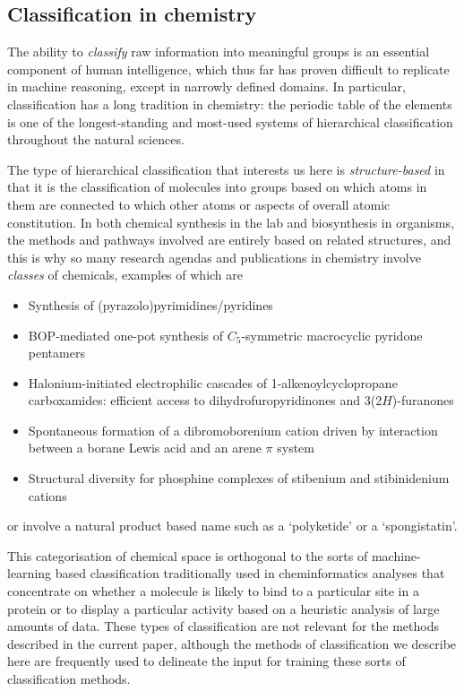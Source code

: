 \documentclass[10pt]{bmc_article}
\newenvironment{bmcformat}{\baselineskip20pt\sloppy\setboolean{publ}{false}}{\baselineskip20pt\sloppy}
\begin{document}
\begin{bmcformat}
\subsection*{Classification in chemistry}
\label{sec:backclassif}

The ability to \textit{classify} raw information into meaningful groups is an essential component of human intelligence, which thus far has proven difficult to replicate in machine reasoning, except in narrowly defined domains.  In particular, classification has a long tradition in chemistry:  the periodic table of the elements is one of the longest-standing and most-used systems of hierarchical classification throughout the natural sciences.  

The type of hierarchical classification that interests us here is \textit{structure-based} in that it is the classification of molecules into groups based on which atoms in them are connected to which other atoms or aspects of overall atomic constitution.  In both chemical synthesis in the lab and biosynthesis in organisms, the methods and pathways involved are entirely based on related structures, and this is why so many research agendas and publications in chemistry involve \textit{classes} of chemicals, examples of which are 
\begin{itemize}
\item Synthesis of (pyrazolo)pyrimidines/pyridines
\item BOP-mediated one-pot synthesis of $C_5$-symmetric macrocyclic pyridone pentamers
\item Halonium-initiated electrophilic cascades of 1-alkenoylcyclopropane carboxamides: efficient access to dihydrofuropyridinones and 3(2$H$)-furanones
\item Spontaneous formation of a dibromoborenium cation driven by interaction between a borane Lewis acid and an arene $\pi$ system
\item Structural diversity for phosphine complexes of stibenium and stibinidenium cations
\end{itemize}
or involve a natural product based name such as a `polyketide' or a `spongistatin'.  

This categorisation of chemical space is orthogonal to the sorts of machine-learning based classification traditionally used in cheminformatics analyses that concentrate on whether a molecule is likely to bind to a particular site in a protein or to display a particular activity based on a heuristic analysis of large amounts of data. These types of classification are not relevant for the methods described in the current paper, although the methods of classification we describe here are frequently used to delineate the input for training these sorts of classification methods.  


\end{bmcformat}
\end{document}
